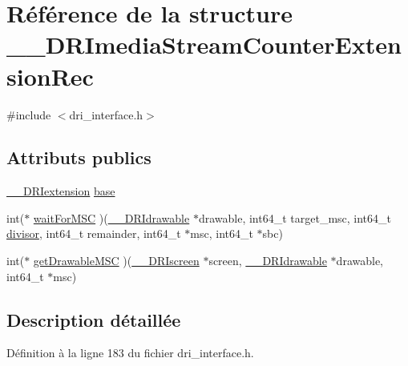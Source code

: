 \hypertarget{struct_____d_r_imedia_stream_counter_extension_rec}{\section{Référence de la structure \-\_\-\-\_\-\-D\-R\-Imedia\-Stream\-Counter\-Extension\-Rec}
\label{struct_____d_r_imedia_stream_counter_extension_rec}
}


{\ttfamily \#include $<$dri\-\_\-interface.\-h$>$}

\subsection*{Attributs publics}
\begin{DoxyCompactItemize}
\item 
\hyperlink{dri__interface_8h_a4e0a61c8ece00d2b2c6792a9a1b55385}{\-\_\-\-\_\-\-D\-R\-Iextension} \hyperlink{struct_____d_r_imedia_stream_counter_extension_rec_a042c5ddf263000434a369b5da09efacc}{base}
\item 
int($\ast$ \hyperlink{struct_____d_r_imedia_stream_counter_extension_rec_aeda6d64b0682f087ddbac0b328678824}{wait\-For\-M\-S\-C} )(\hyperlink{dri__interface_8h_a5bfb832a0a08208d95b3bbef439d2262}{\-\_\-\-\_\-\-D\-R\-Idrawable} $\ast$drawable, int64\-\_\-t target\-\_\-msc, int64\-\_\-t \hyperlink{glext_8h_a8663d897b5393d6facc1df40530f841d}{divisor}, int64\-\_\-t remainder, int64\-\_\-t $\ast$msc, int64\-\_\-t $\ast$sbc)
\item 
int($\ast$ \hyperlink{struct_____d_r_imedia_stream_counter_extension_rec_a937928e0af1fad374769623dfaf5e84b}{get\-Drawable\-M\-S\-C} )(\hyperlink{dri__interface_8h_a9961b01d421ee1fd6ed3c05acc9ca561}{\-\_\-\-\_\-\-D\-R\-Iscreen} $\ast$screen, \hyperlink{dri__interface_8h_a5bfb832a0a08208d95b3bbef439d2262}{\-\_\-\-\_\-\-D\-R\-Idrawable} $\ast$drawable, int64\-\_\-t $\ast$msc)
\end{DoxyCompactItemize}


\subsection{Description détaillée}


Définition à la ligne 183 du fichier dri\-\_\-interface.\-h.



